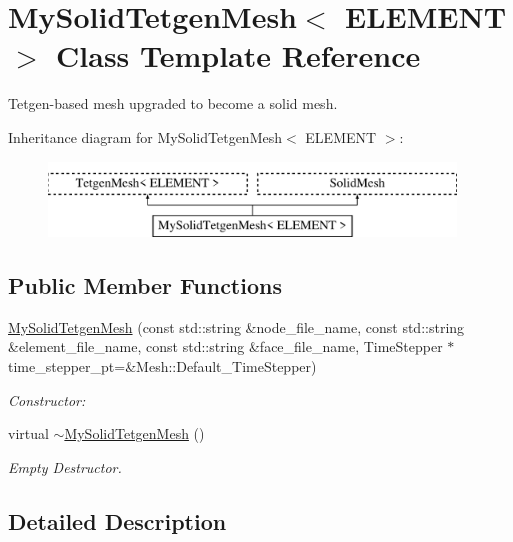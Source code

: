\hypertarget{classMySolidTetgenMesh}{}\section{My\+Solid\+Tetgen\+Mesh$<$ E\+L\+E\+M\+E\+NT $>$ Class Template Reference}
\label{classMySolidTetgenMesh}


Tetgen-\/based mesh upgraded to become a solid mesh.  


Inheritance diagram for My\+Solid\+Tetgen\+Mesh$<$ E\+L\+E\+M\+E\+NT $>$\+:\begin{figure}[H]
\begin{center}
\leavevmode
\includegraphics[height=2.000000cm]{classMySolidTetgenMesh}
\end{center}
\end{figure}
\subsection*{Public Member Functions}
\begin{DoxyCompactItemize}
\item 
\hyperlink{classMySolidTetgenMesh_ac6f8d5bf403bb9da0149184c30eb6d8d}{My\+Solid\+Tetgen\+Mesh} (const std\+::string \&node\+\_\+file\+\_\+name, const std\+::string \&element\+\_\+file\+\_\+name, const std\+::string \&face\+\_\+file\+\_\+name, Time\+Stepper $\ast$time\+\_\+stepper\+\_\+pt=\&Mesh\+::\+Default\+\_\+\+Time\+Stepper)
\begin{DoxyCompactList}\small\item\em Constructor\+: \end{DoxyCompactList}\item 
virtual \hyperlink{classMySolidTetgenMesh_ad0e9bf1679a2ba8d3d655b95d7124e91}{$\sim$\+My\+Solid\+Tetgen\+Mesh} ()
\begin{DoxyCompactList}\small\item\em Empty Destructor. \end{DoxyCompactList}\end{DoxyCompactItemize}


\subsection{Detailed Description}
